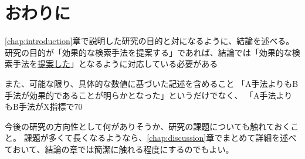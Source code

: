 \chapter{おわりに}
\label{chap:conclusion}

\ref{chap:introduction}章で説明した研究の目的と対になるように、結論を述べる。
研究の目的が「効果的な検索手法を提案する」であれば、結論では「効果的な検索手法を\underline{提案した}」となるように対応している必要がある

また、可能な限り、具体的な数値に基づいた記述を含めること
「A手法よりもB手法が効果的であることが明らかとなった」というだけでなく、
「A手法よりもB手法がX指標で70%

今後の研究の方向性として何がありそうか、研究の課題についても触れておくこと。
課題が多くて長くなるようなら、\ref{chap:discussion}章でまとめて詳細を述べておいて、結論の章では簡潔に触れる程度にするのでもよい。
